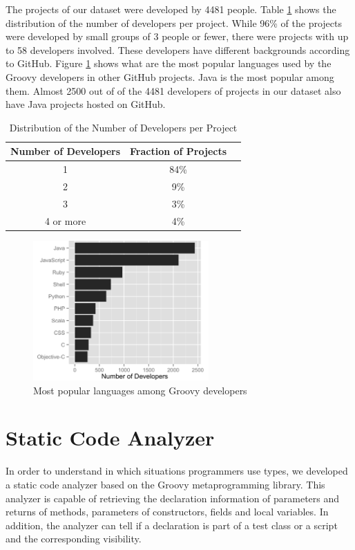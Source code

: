\documentclass[msc]{ppgccufmg}
\begin{document}
The projects of our dataset were developed by 4481 people.
Table \ref{tab:number_of_developers} shows the distribution of the number of developers per project.
While 96\% of the projects were developed by small groups of 3 people or fewer, there were projects with up to 58 developers involved.
These developers have different backgrounds according to GitHub.
Figure \ref{fig:other_languages} shows what are the most popular languages used by the Groovy developers in other GitHub projects. 
Java is the most popular among them.
Almost 2500 out of  of the 4481 developers of projects in our dataset also have Java projects hosted on GitHub.

\begin{table}[ht]
\caption{Distribution of the Number of Developers per Project}
\centering{}%
\begin{tabular}{|c|c|c|}
\hline 
Number of Developers & Fraction of Projects\tabularnewline
\hline 
\hline 
1 & 84\%\tabularnewline
\hline 
2 & 9\%\tabularnewline
\hline 
3 & 3\%\tabularnewline
\hline 
4 or more & 4\%\tabularnewline
\hline 
\end{tabular}
\label{tab:number_of_developers}
\end{table}


\begin{figure}[h!]
\centering \includegraphics[width=0.6\textwidth]{../aosd_2014/analysis/result/languages.png}
\caption{Most popular languages among Groovy developers}
\label{fig:other_languages} 
\end{figure}



\section{Static Code Analyzer\label{analyzer}}
In order to understand in which situations programmers use types, we developed a static code analyzer based on the Groovy metaprogramming library.
This analyzer is capable of retrieving the declaration information of parameters and returns of methods, parameters of constructors, fields and local variables.
In addition, the analyzer can tell if a declaration is part of a test class or a script and the corresponding visibility.
\end{document}

